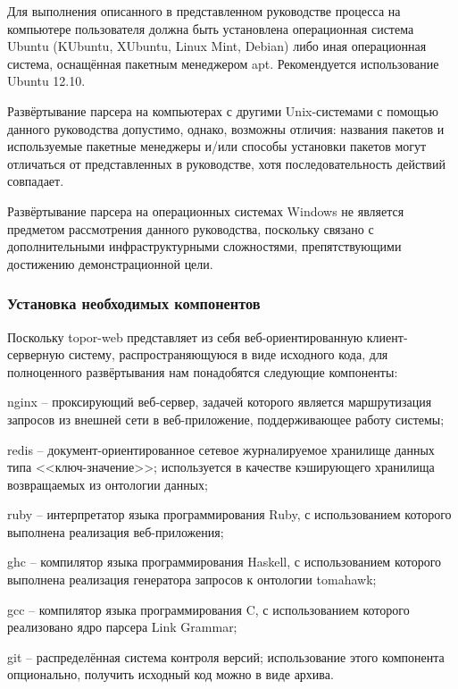 Для выполнения описанного в представленном руководстве процесса на компьютере пользователя должна быть установлена операционная система
Ubuntu (KUbuntu, XUbuntu, Linux Mint, Debian) либо иная операционная система, оснащённая пакетным менеджером apt. Рекомендуется использование Ubuntu 12.10.

Развёртывание парсера на компьютерах с другими Unix-системами с помощью данного руководства допустимо, однако, возможны отличия:
названия пакетов и используемые пакетные менеджеры и/или способы установки пакетов могут отличаться от представленных в руководстве, хотя
последовательность действий совпадает.

Развёртывание парсера на операционных системах Windows не является предметом рассмотрения данного руководства, поскольку связано с
дополнительными инфраструктурными сложностями, препятствующими достижению демонстрационной цели.

\subsubsection{Установка необходимых компонентов}

Поскольку topor-web представляет из себя веб-ориентированную
клиент-серверную систему, распространяющуюся в виде исходного кода, для
полноценного развёртывания нам понадобятся следующие компоненты:

\begin{list}{}{\leftmargin=1.5cm}
	\item nginx – проксирующий веб-сервер, задачей которого является
маршрутизация запросов из внешней сети в веб-приложение,
поддерживающее работу системы;
	\item redis – документ-ориентированное сетевое журналируемое хранилище
данных типа <<ключ-значение>>; используется в качестве кэширующего
хранилища возвращаемых из онтологии данных;
	\item ruby – интерпретатор языка программирования Ruby, с использованием
которого выполнена реализация веб-приложения;
	\item ghc – компилятор языка программирования Haskell, с использованием
которого выполнена реализация генератора запросов к онтологии tomahawk;
	\item gcc – компилятор языка программирования C, с использованием
которого реализовано ядро парсера Link Grammar;
	\item git – распределённая система контроля версий; использование этого
компонента опционально, получить исходный код можно в виде архива.
\end{list}

